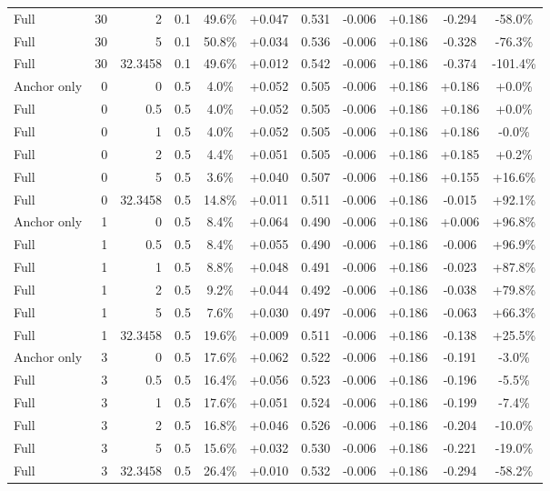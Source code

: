 \begin{table}[htbp]
\begin{tabular}{lrrrccccccc}
Full & 30 & 2 & 0.1 & 49.6\% & +0.047 & 0.531 & -0.006 & +0.186 & -0.294 & -58.0\% \\
Full & 30 & 5 & 0.1 & 50.8\% & +0.034 & 0.536 & -0.006 & +0.186 & -0.328 & -76.3\% \\
Full & 30 & 32.3458 & 0.1 & 49.6\% & +0.012 & 0.542 & -0.006 & +0.186 & -0.374 & -101.4\% \\
Anchor only & 0 & 0 & 0.5 & 4.0\% & +0.052 & 0.505 & -0.006 & +0.186 & +0.186 & +0.0\% \\
Full & 0 & 0.5 & 0.5 & 4.0\% & +0.052 & 0.505 & -0.006 & +0.186 & +0.186 & +0.0\% \\
Full & 0 & 1 & 0.5 & 4.0\% & +0.052 & 0.505 & -0.006 & +0.186 & +0.186 & -0.0\% \\
Full & 0 & 2 & 0.5 & 4.4\% & +0.051 & 0.505 & -0.006 & +0.186 & +0.185 & +0.2\% \\
Full & 0 & 5 & 0.5 & 3.6\% & +0.040 & 0.507 & -0.006 & +0.186 & +0.155 & +16.6\% \\
Full & 0 & 32.3458 & 0.5 & 14.8\% & +0.011 & 0.511 & -0.006 & +0.186 & -0.015 & +92.1\% \\
Anchor only & 1 & 0 & 0.5 & 8.4\% & +0.064 & 0.490 & -0.006 & +0.186 & +0.006 & +96.8\% \\
Full & 1 & 0.5 & 0.5 & 8.4\% & +0.055 & 0.490 & -0.006 & +0.186 & -0.006 & +96.9\% \\
Full & 1 & 1 & 0.5 & 8.8\% & +0.048 & 0.491 & -0.006 & +0.186 & -0.023 & +87.8\% \\
Full & 1 & 2 & 0.5 & 9.2\% & +0.044 & 0.492 & -0.006 & +0.186 & -0.038 & +79.8\% \\
Full & 1 & 5 & 0.5 & 7.6\% & +0.030 & 0.497 & -0.006 & +0.186 & -0.063 & +66.3\% \\
Full & 1 & 32.3458 & 0.5 & 19.6\% & +0.009 & 0.511 & -0.006 & +0.186 & -0.138 & +25.5\% \\
Anchor only & 3 & 0 & 0.5 & 17.6\% & +0.062 & 0.522 & -0.006 & +0.186 & -0.191 & -3.0\% \\
Full & 3 & 0.5 & 0.5 & 16.4\% & +0.056 & 0.523 & -0.006 & +0.186 & -0.196 & -5.5\% \\
Full & 3 & 1 & 0.5 & 17.6\% & +0.051 & 0.524 & -0.006 & +0.186 & -0.199 & -7.4\% \\
Full & 3 & 2 & 0.5 & 16.8\% & +0.046 & 0.526 & -0.006 & +0.186 & -0.204 & -10.0\% \\
Full & 3 & 5 & 0.5 & 15.6\% & +0.032 & 0.530 & -0.006 & +0.186 & -0.221 & -19.0\% \\
Full & 3 & 32.3458 & 0.5 & 26.4\% & +0.010 & 0.532 & -0.006 & +0.186 & -0.294 & -58.2\% \\

\end{tabular}
\end{table}
